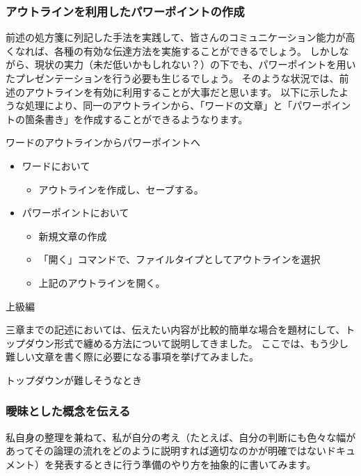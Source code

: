 \documentclass[12pt,a4paper]{jsarticle}
\makeatletter
\def\section{\@startsection 
{section}
{1}
{\z@}
{3.5ex plus -1ex minus -.2ex}
{1.5ex plus .2ex}
{\large\bf}
}
\def\subsection{\@startsection 
{subsection}
{1}
{\z@}
{3.5ex plus -1ex minus -.2ex}
{1.ex plus .2ex}
{\large\bf}
}
\makeatother
\begin{document}
\subsubsection{アウトラインを利用したパワーポイントの作成}

前述の処方箋に列記した手法を実践して、皆さんのコミュニケーション能力が高くなれば、各種の有効な伝達方法を実施することができるでしょう。
しかしながら、現状の実力（未だ低いかもしれない？）の下でも、パワーポイントを用いたプレゼンテーションを行う必要も生じるでしょう。
そのような状況では、前述のアウトラインを有効に利用することが大事だと思います。
以下に示したような処理により、同一のアウトラインから、「ワードの文章」と「パワーポイントの箇条書き」を作成することができるようなります。

ワードのアウトラインからパワーポイントへ
\begin{itemize}
\item
ワードにおいて
	\begin{itemize}
	\item
	アウトラインを作成し、セーブする。
	\end{itemize}
\item
パワーポイントにおいて
	\begin{itemize}
	\item
	新規文章の作成
	\item
	「開く」コマンドで、ファイルタイプとしてアウトラインを選択
	\item
	上記のアウトラインを開く。
	\end{itemize}
\end{itemize}

\section{上級編}

三章までの記述においては、伝えたい内容が比較的簡単な場合を題材にして、トップダウン形式で纏める方法について説明してきました。
ここでは、もう少し難しい文章を書く際に必要になる事項を挙げてみました。

\subsection{トップダウンが難しそうなとき}

\subsubsection{曖昧とした概念を伝える}

私自身の整理を兼ねて、私が自分の考え（たとえば、自分の判断にも色々な幅があってその論理の流れをどのように説明すれば適切なのかが明確ではないドキュメント）を発表するときに行う準備のやり方を抽象的に書いてみます。
\end{document}
